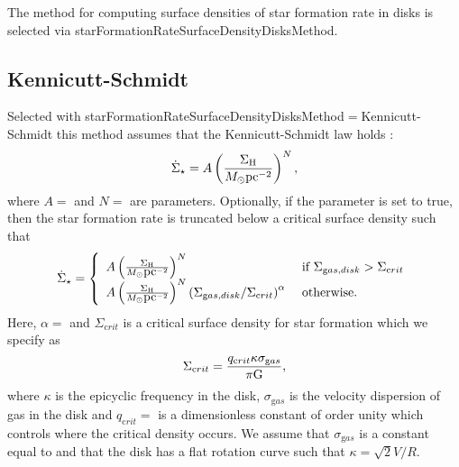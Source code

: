 The method for computing surface densities of star formation rate in disks is selected via {\normalfont \ttfamily starFormationRateSurfaceDensityDisksMethod}.

\subsection{Kennicutt-Schmidt}\label{sec:StarFormationKennicuttSchmidt}

Selected with {\normalfont \ttfamily starFormationRateSurfaceDensityDisksMethod}$=${\normalfont \ttfamily Kennicutt-Schmidt} this method assumes that the Kennicutt-Schmidt law holds \citep{schmidt_rate_1959,kennicutt_global_1998}:
\begin{equation}
\dot{\Sigma}_\star = A \left({\Sigma_{\mathrm H} \over M_\odot \hbox{pc}^{-2}} \right)^N,
\end{equation}
where $A=${\normalfont \ttfamily [starFormationKennicuttSchmidtNormalization]} and $N=${\normalfont \ttfamily [starFormationKennicuttSchmidtExponent]} are parameters. Optionally, if the {\normalfont \ttfamily [starFormationKennicuttSchmidtTruncate]} parameter is set to true, then the star formation rate is truncated below a critical surface density such that
\begin{equation}
\dot{\Sigma}_\star = \left\{ \begin{array}{ll} A \left({\Sigma_{\mathrm H} \over M_\odot \hbox{pc}^{-2}} \right)^N & \hbox{ if } \Sigma_{\mathrm gas,disk} > \Sigma_{\mathrm crit} \\ A \left({\Sigma_{\mathrm H} \over M_\odot \hbox{pc}^{-2}} \right)^N \left(\Sigma_{\mathrm gas,disk}/\Sigma_{\mathrm crit}\right)^\alpha & \hbox{ otherwise.} \end{array} \right.
\end{equation}
Here, $\alpha=${\normalfont \ttfamily [starFormationKennicuttSchmidtExponentTruncated]} and $\Sigma_{\mathrm crit}$ is a critical surface density for star formation which we specify as
\begin{equation}
\Sigma_{\mathrm crit} = {q_{\mathrm crit} \kappa \sigma_{\mathrm gas} \over \pi \G},
\end{equation}
where $\kappa$ is the epicyclic frequency in the disk, $\sigma_{\mathrm gas}$ is the velocity dispersion of gas in the disk and $q_{\mathrm crit}=${\normalfont \ttfamily [toomreParameterCritical]} is a dimensionless constant of order unity which controls where the critical density occurs. We assume that $\sigma_{\mathrm gas}$ is a constant equal to {\normalfont \ttfamily [velocityDispersionDiskGas]} and that the disk has a flat rotation curve such that $\kappa = \sqrt{2} V/R$.

